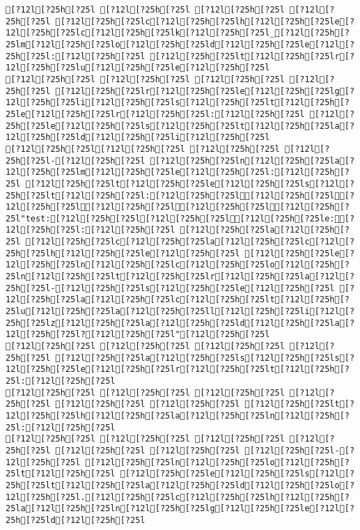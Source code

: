 \documentclass{scrartcl}
\begin{document}
\begin{Verbatim}
[?12l[?25h[?25l [?12l[?25h[?25l [?12l[?25h[?25l [?12l[?25h[?25l [?12l[?25h[?25lc[?12l[?25h[?25lh[?12l[?25h[?25le[?12l[?25h[?25lc[?12l[?25h[?25lk[?12l[?25h[?25l_[?12l[?25h[?25lm[?12l[?25h[?25lo[?12l[?25h[?25ld[?12l[?25h[?25le[?12l[?25h[?25l:[?12l[?25h[?25l [?12l[?25h[?25lt[?12l[?25h[?25lr[?12l[?25h[?25lu[?12l[?25h[?25le[?12l[?25h[?25l
[?12l[?25h[?25l [?12l[?25h[?25l [?12l[?25h[?25l [?12l[?25h[?25l [?12l[?25h[?25lr[?12l[?25h[?25le[?12l[?25h[?25lg[?12l[?25h[?25li[?12l[?25h[?25ls[?12l[?25h[?25lt[?12l[?25h[?25le[?12l[?25h[?25lr[?12l[?25h[?25l:[?12l[?25h[?25l [?12l[?25h[?25le[?12l[?25h[?25ls[?12l[?25h[?25lt[?12l[?25h[?25la[?12l[?25h[?25ld[?12l[?25h[?25li[?12l[?25h[?25l
[?12l[?25h[?25l[?12l[?25h[?25l [?12l[?25h[?25l [?12l[?25h[?25l-[?12l[?25h[?25l [?12l[?25h[?25ln[?12l[?25h[?25la[?12l[?25h[?25lm[?12l[?25h[?25le[?12l[?25h[?25l:[?12l[?25h[?25l [?12l[?25h[?25lt[?12l[?25h[?25le[?12l[?25h[?25ls[?12l[?25h[?25lt[?12l[?25h[?25l:[?12l[?25h[?25l[?12l[?25h[?25l[?12l[?25h[?25l[?12l[?25h[?25l[?12l[?25h[?25l[?12l[?25h[?25l"test:[?12l[?25h[?25l[?12l[?25h[?25l[?12l[?25h[?25le:[?12l[?25h[?25l:[?12l[?25h[?25l [?12l[?25h[?25la[?12l[?25h[?25l [?12l[?25h[?25lc[?12l[?25h[?25la[?12l[?25h[?25lc[?12l[?25h[?25lh[?12l[?25h[?25le[?12l[?25h[?25l [?12l[?25h[?25le[?12l[?25h[?25ln[?12l[?25h[?25lc[?12l[?25h[?25lo[?12l[?25h[?25ln[?12l[?25h[?25lt[?12l[?25h[?25lr[?12l[?25h[?25la[?12l[?25h[?25l-[?12l[?25h[?25ls[?12l[?25h[?25le[?12l[?25h[?25l [?12l[?25h[?25la[?12l[?25h[?25lc[?12l[?25h[?25lt[?12l[?25h[?25lu[?12l[?25h[?25la[?12l[?25h[?25ll[?12l[?25h[?25li[?12l[?25h[?25lz[?12l[?25h[?25la[?12l[?25h[?25ld[?12l[?25h[?25la[?12l[?25h[?25l?[?12l[?25h[?25l"[?12l[?25h[?25l
[?12l[?25h[?25l [?12l[?25h[?25l [?12l[?25h[?25l [?12l[?25h[?25l [?12l[?25h[?25la[?12l[?25h[?25ls[?12l[?25h[?25ls[?12l[?25h[?25le[?12l[?25h[?25lr[?12l[?25h[?25lt[?12l[?25h[?25l:[?12l[?25h[?25l
[?12l[?25h[?25l [?12l[?25h[?25l [?12l[?25h[?25l [?12l[?25h[?25l [?12l[?25h[?25l [?12l[?25h[?25l [?12l[?25h[?25lt[?12l[?25h[?25lh[?12l[?25h[?25la[?12l[?25h[?25ln[?12l[?25h[?25l:[?12l[?25h[?25l
[?12l[?25h[?25l [?12l[?25h[?25l [?12l[?25h[?25l [?12l[?25h[?25l [?12l[?25h[?25l [?12l[?25h[?25l [?12l[?25h[?25l-[?12l[?25h[?25l [?12l[?25h[?25ln[?12l[?25h[?25lo[?12l[?25h[?25lt[?12l[?25h[?25l [?12l[?25h[?25le[?12l[?25h[?25ls[?12l[?25h[?25lt[?12l[?25h[?25la[?12l[?25h[?25ld[?12l[?25h[?25lo[?12l[?25h[?25l.[?12l[?25h[?25lc[?12l[?25h[?25lh[?12l[?25h[?25la[?12l[?25h[?25ln[?12l[?25h[?25lg[?12l[?25h[?25le[?12l[?25h[?25ld[?12l[?25h[?25l

\end{Verbatim}
\end{document}
